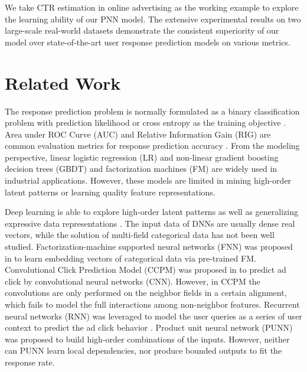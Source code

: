 \documentclass[conference]{IEEEtran}
\begin{document}
We take CTR estimation in online advertising as the working example to explore the learning ability of our PNN model. The extensive experimental results on two large-scale real-world datasets demonstrate the consistent superiority of our model over state-of-the-art user response prediction models \cite{ta2015factorization,liu2015convolutional,zhang2016deep} on various metrics.












\section{Related Work}\label{sec:related}
The response prediction problem is normally formulated as a binary classification problem with prediction likelihood or cross entropy as the training objective \cite{richardson2007predicting}.
Area under ROC Curve (AUC) and Relative Information Gain (RIG) are common evaluation metrics for response prediction accuracy \cite{graepel2010web}.
From the modeling perspective, linear logistic regression (LR) \cite{lee2012estimating,ren2016user} and non-linear gradient boosting decision trees (GBDT) \cite{he2014practical} and factorization machines (FM) \cite{ta2015factorization} are widely used in industrial applications. However, these models are limited in mining high-order latent patterns or learning quality feature representations.


Deep learning is able to explore high-order latent patterns as well as generalizing expressive data representations \cite{mikolov2013distributed}.
The input data of DNNs are usually dense real vectors, while the solution of multi-field categorical data has not been well studied. Factorization-machine supported neural networks (FNN) was proposed in \cite{zhang2016deep} to learn embedding vectors of categorical data via pre-trained FM.
Convolutional Click Prediction Model (CCPM) was proposed in \cite{liu2015convolutional} to predict ad click by convolutional neural networks (CNN). However, in CCPM the convolutions are only performed on the neighbor fields in a certain alignment, which fails to model the full interactions among non-neighbor features.
Recurrent neural networks (RNN) was leveraged to model the user queries as a series of user context to predict the ad click behavior \cite{zhang2014sequential}.
Product unit neural network (PUNN) \cite{engelbrecht1999training} was proposed to build high-order combinations of the inputs. However, neither can PUNN learn local dependencies, nor produce bounded outputs to fit the response rate.
\end{document}
